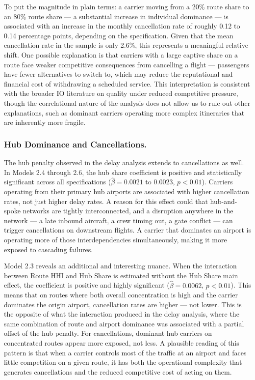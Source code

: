 \documentclass[preprint,12pt,authoryear]{elsarticle}
\begin{document}
To put the magnitude in plain terms: a carrier moving from a 20\% route share to an 80\% route share --- a substantial increase in individual dominance — is associated with an increase in the monthly cancellation rate of roughly 0.12 to 0.14 percentage points, depending on the specification. Given that the mean cancellation rate in the sample is only 2.6\%, this represents a meaningful relative shift. One possible explanation is that carriers with a large captive share on a route face weaker competitive consequences from cancelling a flight --- passengers have fewer alternatives to switch to, which may reduce the reputational and financial cost of withdrawing a scheduled service. This interpretation is consistent with the broader IO literature on quality under reduced competitive pressure, though the correlational nature of the analysis does not allow us to rule out other explanations, such as dominant carriers operating more complex itineraries that are inherently more fragile.

\subsubsection{Hub Dominance and Cancellations.}
The hub penalty observed in the delay analysis extends to cancellations as well. In Models 2.4 through 2.6, the hub share coefficient is positive and statistically significant across all specifications ($\hat{\beta} = 0.0021$ to $0.0023$, $p < 0.01$). Carriers operating from their primary hub airports are associated with higher cancellation rates, not just higher delay rates. A reason for this effect could that hub-and-spoke networks are tightly interconnected, and a disruption anywhere in the network --- a late inbound aircraft, a crew timing out, a gate conflict --- can trigger cancellations on downstream flights. A carrier that dominates an airport is operating more of those interdependencies simultaneously, making it more exposed to cascading failures.

Model 2.3 reveals an additional and interesting nuance. When the interaction between Route HHI and Hub Share is estimated without the Hub Share main effect, the coefficient is positive and highly significant ($\hat{\beta} = 0.0062$, $p < 0.01$). This means that on routes where both overall concentration is high and the carrier dominates the origin airport, cancellation rates are higher — not lower. This is the opposite of what the interaction produced in the delay analysis, where the same combination of route and airport dominance was associated with a partial offset of the hub penalty. For cancellations, dominant hub carriers on concentrated routes appear more exposed, not less. A plausible reading of this pattern is that when a carrier controls most of the traffic at an airport and faces little competition on a given route, it has both the operational complexity that generates cancellations and the reduced competitive cost of acting on them.
\end{document}

